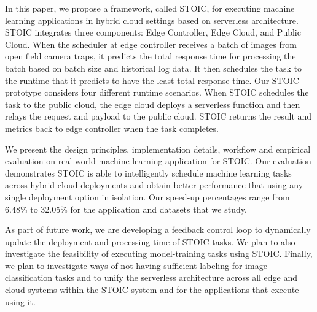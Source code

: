 In this paper, we propose a framework, called STOIC, for executing machine learning applications in hybrid cloud settings based on serverless architecture. STOIC integrates three components: Edge Controller, Edge Cloud, and Public Cloud. When the scheduler at edge controller receives a batch of images from open field camera traps, it predicts the total response time for processing the batch based on batch size and historical log data. It then schedules the task to the runtime that it predicts to have the least total response time.  Our STOIC prototype considers four different runtime scenarios. When STOIC schedules the task to the public cloud, the edge cloud deploys a serverless function and then relays the request and payload to the public cloud. STOIC returns the result and metrics back to edge controller when the task completes.

We present the design principles, implementation details, workflow and empirical evaluation on real-world machine learning application for STOIC. Our evaluation demonstrates STOIC is able to intelligently schedule machine learning tasks across hybrid cloud deployments and obtain better performance that using any single deployment option in isolation.  Our speed-up percentages range from 6.48\% to 32.05\% for the application and datasets that we study.

As part of future work, we are developing a feedback control loop to dynamically update the deployment and processing time of STOIC tasks. We plan to also investigate the feasibility of executing model-training tasks using STOIC. Finally, we plan to investigate ways of not having sufficient labeling for image classification tasks and to unify the serverless architecture across all edge and cloud systems within the STOIC system and for the applications that execute using it.
